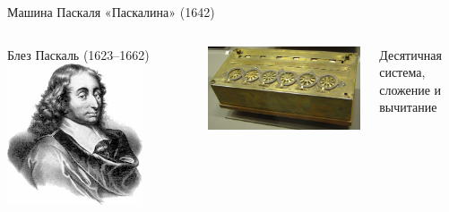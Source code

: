 \begin{frame}{Машина Паскаля «Паскалина» (1642)}
    \begin{columns}
    \column{4cm}
        \begin{block}{Блез Паскаль (1623–1662)}
        \includegraphics[width=4cm,keepaspectratio]{./images/pascal.jpg}
        \end{block}
    \column{7cm} \includegraphics[width=7cm,keepaspectratio]{./images/pascaline.jpg}

    Десятичная система,\\сложение и вычитание
    \end{columns}
\end{frame}

